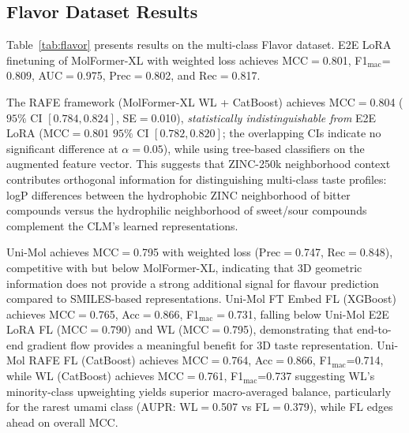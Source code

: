 \documentclass[pdflatex,sn-mathphys-num]{sn-jnl}%
\theoremstyle{thmstyleone}%
\theoremstyle{thmstyletwo}%
\theoremstyle{thmstylethree}%
\begin{document}
\subsection{Flavor Dataset Results}
Table~\ref{tab:flavor} presents results on the multi-class Flavor dataset. E2E LoRA finetuning of MolFormer-XL with weighted loss achieves MCC$=$0.801, F1$_\text{mac}$=$0.809$, AUC$=$0.975, Prec$=$0.802, and Rec$=$0.817.

The RAFE framework (MolFormer-XL WL + CatBoost) achieves MCC$=$0.804 ($95\%$ CI $[0.784, 0.824]$, SE$=$0.010), \emph{statistically indistinguishable from} E2E LoRA (MCC$=$0.801 $95\%$ CI $[0.782, 0.820]$; the overlapping CIs indicate no significant difference at $\alpha = 0.05$), while using tree-based classifiers on the augmented feature vector. This suggests that ZINC-250k neighborhood context contributes orthogonal information for distinguishing multi-class taste profiles: logP differences between the
hydrophobic ZINC neighborhood of bitter compounds versus the hydrophilic neighborhood of sweet/sour compounds complement the CLM's learned representations.

Uni-Mol achieves MCC$=$0.795 with weighted loss (Prec$=$0.747, Rec$=$0.848), competitive with but below MolFormer-XL, indicating that 3D geometric information does not provide a strong additional signal for flavour prediction compared to SMILES-based representations. Uni-Mol FT Embed FL (XGBoost) achieves MCC$=$0.765, Acc$=$0.866, F1$_\text{mac}=$0.731, falling below Uni-Mol E2E LoRA FL (MCC$=$0.790) and WL (MCC$=$0.795), demonstrating that end-to-end gradient flow provides a meaningful benefit for 3D taste representation. Uni-Mol RAFE FL (CatBoost) achieves MCC$=$0.764, Acc$=$0.866, F1$_\text{mac}$=0.714, while WL (CatBoost) achieves MCC$=$0.761, F1$_\text{mac}$=0.737 suggesting WL's minority-class upweighting yields superior macro-averaged balance, particularly for the rarest umami class (AUPR: WL$=$0.507 vs FL$=$0.379), while FL edges ahead on overall MCC.
\end{document}
